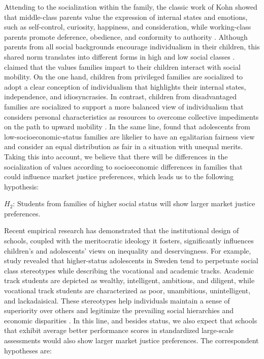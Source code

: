 \documentclass[
    behavsci,
    article,
    submit,
moreauthors
]{mdpi}
\begin{document}
Attending to the socialization within the family, the classic work of
Kohn showed that middle-class parents value the expression of internal
states and emotions, such as self-control, curiosity, happiness, and
consideration, while working-class parents promote deference, obedience,
and conformity to authority \citep{kohn_social_1963, kohn_class_1969}.
Although parents from all social backgrounds encourage individualism in
their children, this shared norm translates into different forms in high
and low social classes \citep{kohn_class_1969}.
\citet{acemoglu_obedience_2021} claimed that the values families impart
to their children interact with social mobility. On the one hand,
children from privileged families are socialized to adopt a clear
conception of individualism that highlights their internal states,
independence, and idiosyncrasies. In contrast, children from
disadvantaged families are socialized to support a more balanced view of
individualism that considers personal characteristics as resources to
overcome collective impediments on the path to upward mobility
\citep{iacoviello_collectivism_2019}. In the same line,
\citet{almas_fairness_2017} found that adolescents from
low-socioeconomic-status families are likelier to have an egalitarian
fairness view and consider an equal distribution as fair in a situation
with unequal merits. Taking this into account, we believe that there
will be differences in the socialization of values according to
socioeconomic differences in families that could influence market
justice preferences, which leads us to the following hypothesis:

\(H_2\): Students from families of higher social status will show larger
market justice preferences.

Recent empirical research has demonstrated that the institutional design
of schools, coupled with the meritocratic ideology it fosters,
significantly influences children's and adolescents' views on inequality
and deservingness. For example, \citet{jonsson_institutional_2015} study
revealed that higher-status adolescents in Sweden tend to perpetuate
social class stereotypes while describing the vocational and academic
tracks. Academic track students are depicted as wealthy, intelligent,
ambitious, and diligent, while vocational track students are
characterized as poor, unambitious, unintelligent, and lackadaisical.
These stereotypes help individuals maintain a sense of superiority over
others and legitimize the prevailing social hierarchies and economic
disparities \citep{jost_attitudinal_2000}. In this line, and besides
status, we also expect that schools that exhibit average better
performance scores in standardized large-scale assessments would also
show larger market justice preferences. The correspondent hypotheses
are:
\end{document}
